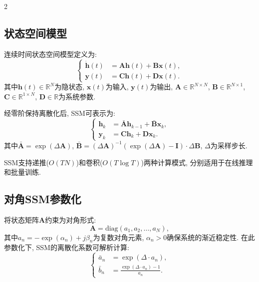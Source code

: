 \begin{multicols}{2}
\subsection{状态空间模型}

连续时间状态空间模型定义为:
\begin{equation}
\left\{\begin{aligned}
\dot{{\bm h}}(t) &= {\bm A}{\bm h}(t) + {\bm B}{\bm x}(t),\\
{\bm y}(t) &= {\bm C}{\bm h}(t) + {\bm D}{\bm x}(t).
\end{aligned}\right.
\end{equation}
其中${\bm h}(t) \in \mathbb{R}^{N}$为隐状态, ${\bm x}(t)$为输入, ${\bm y}(t)$为输出,
${\bm A} \in \mathbb{R}^{N \times N}$, ${\bm B} \in \mathbb{R}^{N \times 1}$,
${\bm C} \in \mathbb{R}^{1 \times N}$, ${\bm D} \in \mathbb{R}$为系统参数.

经零阶保持离散化后, SSM可表示为:
\begin{equation}
\left\{\begin{aligned}
{\bm h}_k &= \bar{{\bm A}}{\bm h}_{k-1} + \bar{{\bm B}}{\bm x}_k,\\
{\bm y}_k &= {\bm C}{\bm h}_k + {\bm D}{\bm x}_k.
\end{aligned}\right.
\end{equation}
其中$\bar{{\bm A}} = \exp(\Delta {\bm A})$, $\bar{{\bm B}} = (\Delta {\bm A})^{-1}(\exp(\Delta {\bm A}) - {\bm I}) \cdot \Delta {\bm B}$,
$\Delta$为采样步长.

SSM支持递推($O(TN)$)和卷积($O(T\log T)$)两种计算模式, 分别适用于在线推理和批量训练.

\subsection{对角SSM参数化}

将状态矩阵${\bm A}$约束为对角形式:
\begin{equation}
{\bm A} = \text{diag}(a_1, a_2, \ldots, a_N),
\end{equation}
其中$a_n = -\exp(\alpha_n) + j\beta_n$为复数对角元素,
$\alpha_n > 0$确保系统的渐近稳定性.
在此参数化下, SSM的离散化系数可解析计算:
\begin{equation}
\left\{\begin{aligned}
\bar{a}_n &= \exp(\Delta \cdot a_n), \\
\bar{b}_n &= \frac{\exp(\Delta \cdot a_n) - 1}{a_n}.
\end{aligned}\right.
\end{equation}


\end{multicols}
